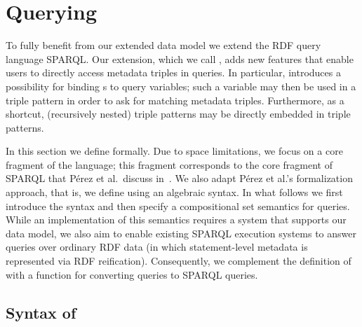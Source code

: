 \section{Querying} \label{Section:Querying}

To fully benefit from our extended data model we extend the RDF query language SPARQL. Our extension, which we call \emph{\SPARQLplus}, adds new features that enable users to directly access metadata triples in queries. In particular, {\SPARQLplus} introduces a possibility for binding {\RDFplusTriple}s to query variables; such a variable may then be used in a triple pattern in order to ask for matching metadata triples. Furthermore, as a shortcut, (recursively nested) triple patterns may be directly embedded in triple patterns.

In this section we define {\SPARQLplus} formally. Due to space limitations, we focus on a core fragment of the language; this fragment corresponds to the core fragment of SPARQL that P\'{e}rez et al.~discuss in~\cite{Perez09:SemanticsAndComplexityOfSPARQL}. We also adapt P\'{e}rez et al.'s formalization approach, that is, we define {\SPARQLplus} using an algebraic syntax. In what follows we first introduce the syntax and then specify a compositional set semantics for {\SPARQLplus} queries. While an implementation of this semantics requires a system that supports our {\RDFplus} data model, we also aim to enable existing SPARQL execution systems to answer
{\SPARQLplus} queries over ordinary RDF data (in which statement-level metadata is represented via RDF reification). Consequently, we complement the definition of {\SPARQLplus}
with a function for converting {\SPARQLplus} queries to SPARQL queries. %


\subsection{Syntax of {\SPARQLplus}}

